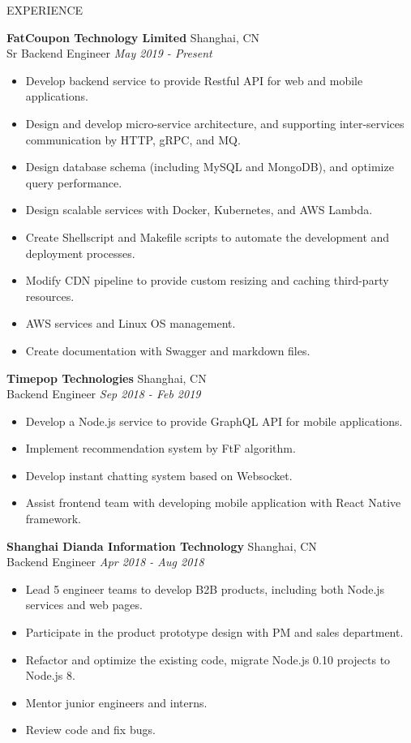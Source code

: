 \documentclass{resume} %
\begin{document}
\begin{rSection}{EXPERIENCE}

  \textbf{FatCoupon Technology Limited} \hfill Shanghai, CN\\
  Sr Backend Engineer \hfill \textit{May 2019 - Present}
  \begin{itemize}
    \itemsep -3pt {}
    \item Develop backend service to provide Restful API for web and mobile applications.
    \item Design and develop micro-service architecture, and supporting inter-services communication by HTTP, gRPC, and MQ.
    \item Design database schema (including MySQL and MongoDB), and optimize query performance.
    \item Design scalable services with Docker, Kubernetes, and AWS Lambda.
    \item Create Shellscript and Makefile scripts to automate the development and deployment processes.
    \item Modify CDN pipeline to provide custom resizing and caching third-party resources.
    \item AWS services and Linux OS management.
    \item Create documentation with Swagger and markdown files.
  \end{itemize}
  
  \textbf{Timepop Technologies} \hfill Shanghai, CN\\
  Backend Engineer \hfill \textit{Sep 2018 - Feb 2019}
  \begin{itemize}
    \itemsep -3pt {}
    \item Develop a Node.js service to provide GraphQL API for mobile applications.
    \item Implement recommendation system by FtF algorithm.
    \item Develop instant chatting system based on Websocket.
    \item Assist frontend team with developing mobile application with React Native framework.
  \end{itemize}
  
  \textbf{Shanghai Dianda Information Technology} \hfill Shanghai, CN\\
  Backend Engineer \hfill \textit{Apr 2018 - Aug 2018}
  \begin{itemize}
    \itemsep -3pt {}
    \item Lead 5 engineer teams to develop B2B products, including both Node.js services and web pages.
    \item Participate in the product prototype design with PM and sales department.
    \item Refactor and optimize the existing code, migrate Node.js 0.10 projects to Node.js 8.
    \item Mentor junior engineers and interns.
    \item Review code and fix bugs.
  \end{itemize}
  

\end{rSection}
\end{document}
